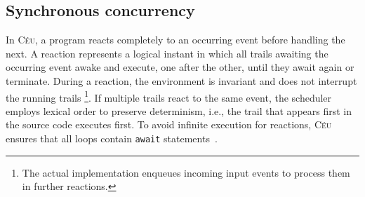\documentclass{sigplanconf}
\newcommand{\CEU}{\textsc{C\'{e}u}\xspace}
\newcommand{\code}[1] {{\small{\texttt{#1}}}}
\newcommand{\1}{\;}
\newcommand{\2}{\;\;}
\newcommand{\3}{\;\;\;}
\newcommand{\5}{\;\;\;\;\;}
\begin{document}

\subsection{Synchronous concurrency}
\label{sec.ceu.sync}

In \CEU, a program reacts completely to an occurring event before handling the 
next.
%
A reaction represents a logical instant in which all trails awaiting the 
occurring event awake and execute, one after the other, until they await again 
or terminate.
%
During a reaction, the environment is invariant and does not interrupt the 
running trails%
\footnote{
The actual implementation enqueues incoming input events to process them in 
further reactions.
}.
If multiple trails react to the same event, the scheduler employs lexical order 
to preserve determinism, i.e., the trail that appears first in the source code 
executes first.
%
To avoid infinite execution for reactions, \CEU ensures that all loops contain 
\code{await} statements~\cite{ceu.sensys13}.
\end{document}
